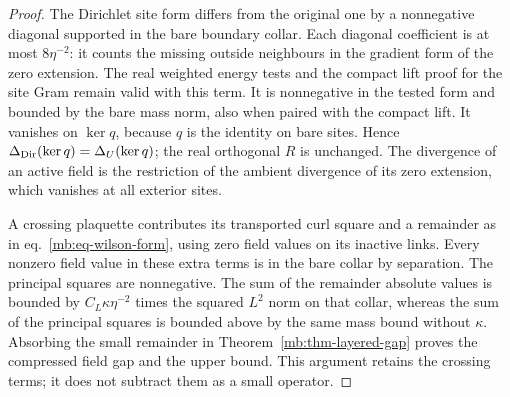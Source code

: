 \documentclass[11pt,letterpaper,reqno]{amsart}
\numberwithin{equation}{section}
\renewcommand{\eqref}[1]{\textup{eq.~\ref{#1}}}
\theoremstyle{definition}
\theoremstyle{remark}
\begin{document}
\begin{proof}
The Dirichlet site form differs from the original one by a
nonnegative diagonal supported in the bare boundary collar.
Each diagonal coefficient is at most \(8\eta^{-2}\): it
counts the missing outside neighbours in the gradient form
of the zero extension. The real weighted energy tests and
the compact lift proof for the site Gram remain valid
with this term. It is nonnegative in the tested form
and bounded by the bare mass norm, also when paired with
the compact lift. It vanishes on \(\ker q\), because \(q\)
is the identity on bare sites. Hence
\(\Delta_{\rm Dir}(\ker q)=\Delta_U(\ker q)\);
the real orthogonal \(R\) is unchanged. The divergence of
an active field is the restriction of the ambient
divergence of its zero extension, which vanishes at all
exterior sites.

A crossing plaquette contributes its transported curl
square and a remainder as in \eqref{mb:eq-wilson-form},
using zero field values on its inactive links.
Every nonzero field value in these extra terms is in
the bare collar by separation. The principal squares
are nonnegative. The sum of the remainder absolute
values is bounded by \(C_L\kappa\eta^{-2}\) times the
squared \(L^2\) norm on that collar, whereas the sum of
the principal squares is bounded above by the same mass
bound without \(\kappa\). Absorbing the small remainder
in Theorem~\ref{mb:thm-layered-gap} proves the compressed
field gap and the upper bound. This argument retains
the crossing terms; it does not subtract them as a
small operator.


\end{proof}
\end{document}
